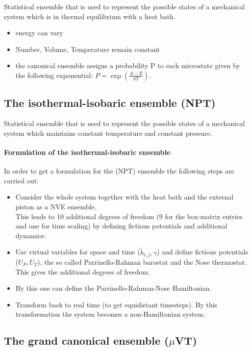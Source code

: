 \documentclass{scrartcl}
\begin{document}
Statistical ensemble that is used to represent the possible states of
a mechanical system which is in thermal equilibrium with a heat bath. 
\begin{itemize}
\item energy can vary
\item Number, Volume, Temperature remain constant
\item the canonical ensemble assigns a probability P to each
  microstate given by the following exponential: \(P =
  \exp(\frac{A-E}{kT})\). 
\end{itemize}

\subsection{The isothermal-isobaric ensemble (NPT)}
\label{sec:isoth-isob-ensemble}

Statistical ensemble that is used to represent the possible states of a
mechanical system which maintains constant temperature and constant
pressure. \\

\paragraph{Formulation of the isothermal-isobaric ensemble}
In order to get a formulation for the (NPT) ensemble the following
steps are carried out: 
\begin{itemize}
\item Consider the whole system together with the heat bath and the
  external piston as a NVE ensemble.\\
  This leads to 10 additional degrees of freedom (9 for the box-matrix
  entries and one for time scaling) by defining fictious potentials
  and additional dynamics: 
\item Use virtual variables for space and time (\(\tilde{h}_{i,j}, \gamma\)) and define
  fictious potentials (\(U_P, U_T\)), the so called Parrinello-Rahman
  barostat and the Nose thermostat. This gives the additional
  degrees of freedom.
\item By this one can define the Parrinello-Rahman-Nose Hamiltonian.
\item Transform back to real time (to get equidistant timesteps). 
  By this transformation the system becomes a non-Hamiltonian system. 
\end{itemize}

\subsection{The grand canonical ensemble (\(\mu\)VT)}
\label{sec:grand-canon-ensemble}
\end{document}
